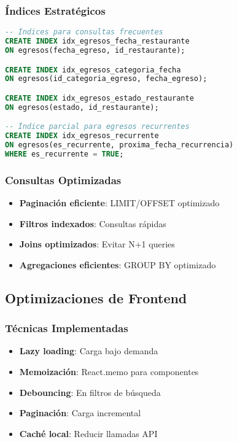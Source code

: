 \documentclass[12pt,a4paper]{article}
\newcommand{\success}[1]{\textcolor{secondarygreen}{\textbf{#1}}}
\begin{document}
\subsubsection{Índices Estratégicos}
\begin{lstlisting}[language=SQL, caption=Índices para optimización de consultas]
-- Índices para consultas frecuentes
CREATE INDEX idx_egresos_fecha_restaurante 
ON egresos(fecha_egreso, id_restaurante);

CREATE INDEX idx_egresos_categoria_fecha 
ON egresos(id_categoria_egreso, fecha_egreso);

CREATE INDEX idx_egresos_estado_restaurante 
ON egresos(estado, id_restaurante);

-- Índice parcial para egresos recurrentes
CREATE INDEX idx_egresos_recurrente 
ON egresos(es_recurrente, proxima_fecha_recurrencia) 
WHERE es_recurrente = TRUE;
\end{lstlisting}

\subsubsection{Consultas Optimizadas}
\begin{itemize}[leftmargin=*]
    \item \success{Paginación eficiente}: LIMIT/OFFSET optimizado
    \item \success{Filtros indexados}: Consultas rápidas
    \item \success{Joins optimizados}: Evitar N+1 queries
    \item \success{Agregaciones eficientes}: GROUP BY optimizado
\end{itemize}

\subsection{Optimizaciones de Frontend}

\subsubsection{Técnicas Implementadas}
\begin{itemize}[leftmargin=*]
    \item \success{Lazy loading}: Carga bajo demanda
    \item \success{Memoización}: React.memo para componentes
    \item \success{Debouncing}: En filtros de búsqueda
    \item \success{Paginación}: Carga incremental
    \item \success{Caché local}: Reducir llamadas API
\end{itemize}
\end{document}
